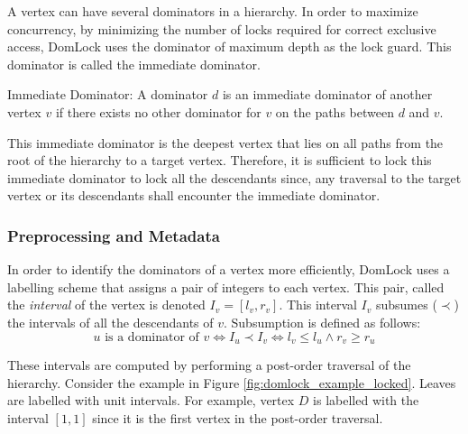 A vertex can have several dominators in a hierarchy. 
In order to maximize concurrency, by minimizing the number of locks required for correct exclusive access, DomLock uses the dominator of maximum depth as the lock guard. This dominator is called the immediate dominator. 




\begin{definition}
    Immediate Dominator: A dominator $d$ is an immediate dominator of another vertex $v$ if there exists no other dominator for $v$ on the paths between $d$ and $v$.
\end{definition}

This immediate dominator is the deepest vertex that lies on all paths from the root of the hierarchy to a target vertex. Therefore, it is sufficient to lock this immediate dominator to lock all the descendants since, any traversal to the target vertex or its descendants shall encounter the immediate dominator.

\subsubsection{Preprocessing and Metadata}

In order to identify the dominators of a vertex more efficiently, DomLock uses a labelling scheme that assigns a pair of integers to each vertex. This pair, called the \emph{interval} of the vertex is denoted  $I_v = [l_v, r_v]$. 
This interval $I_v$ subsumes ($\prec$) the intervals of all the descendants of $v$. Subsumption is defined as follows:
\begin{equation}
    u \text{ is a dominator of } v \iff I_u \prec I_v \iff l_v \leq l_u \land r_v \geq r_u
\end{equation}


These intervals are computed by performing a post-order traversal of the hierarchy. Consider the example in Figure \ref{fig:domlock_example_locked}. Leaves are labelled with unit intervals. For example, vertex $D$ is labelled with the interval $[1, 1]$ since it is the first vertex in the post-order traversal. 

